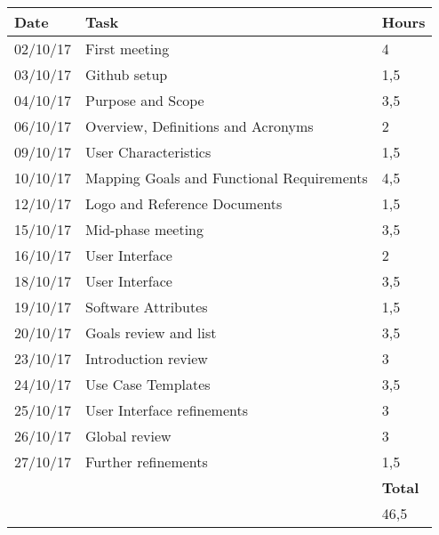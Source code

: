 \begin{tabular}{| l | l | l |}
	\hline
	\textbf{Date} & \textbf{Task} & \textbf{Hours}\\
	\hline
	02/10/17 & First meeting & 4\\
	03/10/17 & Github setup & 1,5\\
	04/10/17 & Purpose and Scope & 3,5\\
	06/10/17 & Overview, Definitions and Acronyms & 2\\
	09/10/17 & User Characteristics & 1,5\\
	10/10/17 & Mapping Goals and Functional Requirements & 4,5 \\
	12/10/17 & Logo and Reference Documents & 1,5 \\
	15/10/17 & Mid-phase meeting & 3,5 \\
	16/10/17 & User Interface & 2 \\
	18/10/17 & User Interface & 3,5 \\
	19/10/17 & Software Attributes & 1,5 \\
	20/10/17 & Goals review and list & 3,5 \\
	23/10/17 & Introduction review & 3 \\
	24/10/17 & Use Case Templates & 3,5\\
	25/10/17 & User Interface refinements & 3 \\
	26/10/17 & Global review & 3 \\
	27/10/17 & Further refinements & 1,5\\
	\hline
	& & \textbf{Total}\\
	\hline
	& & 46,5\\	
	\hline
	
\end{tabular}